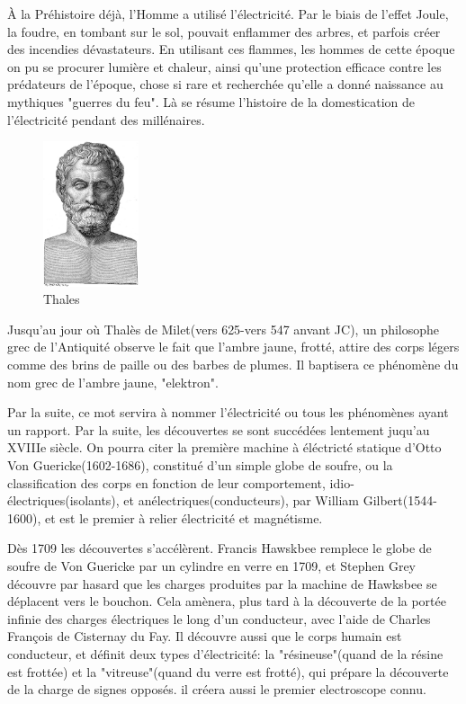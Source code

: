 \documentclass[11pt]{report}
\begin{document}
	    À la Préhistoire déjà, l'Homme a utilisé l'électricité. Par le biais de l'effet Joule, la foudre, en tombant sur le sol, pouvait enflammer des arbres, et parfois créer des incendies dévastateurs. En utilisant ces flammes, les hommes de cette époque on pu se procurer lumière et chaleur, ainsi qu'une protection efficace contre les prédateurs de l'époque, chose si rare et recherchée qu'elle a donné naissance au mythiques "guerres du feu". Là se résume l'histoire de la domestication de l'électricité pendant des millénaires.
\begin{figure}
  \begin{center}
    \includegraphics[width=0.25\textwidth]{thales}
  \end{center}
  \caption{Thales}
\end{figure} Jusqu'au jour où Thalès de Milet(vers 625-vers 547 anvant JC), un philosophe grec de l'Antiquité observe le fait que l'ambre jaune, frotté, attire des corps légers comme des brins de paille ou des barbes de plumes. Il baptisera ce phénomène du nom grec de l'ambre jaune, "elektron".

	Par la suite, ce mot servira à nommer l'électricité ou tous les phénomènes ayant un rapport. Par la suite, les découvertes se sont succédées lentement juqu'au XVIIIe siècle. On pourra citer la première machine à éléctricté statique d'Otto Von Guericke(1602-1686), constitué d'un simple globe de soufre, ou la classification des corps en fonction de leur comportement, idio-électriques(isolants), et anélectriques(conducteurs), par William Gilbert(1544-1600), et est le premier à relier électricité et magnétisme.

    Dès 1709 les découvertes s'accélèrent. Francis Hawskbee remplece le globe de soufre de Von Guericke par un cylindre en verre en 1709, et Stephen Grey découvre par hasard que les charges produites par la machine de Hawksbee se déplacent vers le bouchon. Cela amènera, plus tard à la découverte de la portée infinie des charges électriques le long d'un conducteur, avec l'aide de Charles François de Cisternay du Fay. Il découvre aussi que le corps humain est conducteur, et définit deux types d'électricité: la "résineuse"(quand de la résine est frottée) et la "vitreuse"(quand du verre est frotté), qui prépare la découverte de la charge de signes opposés. il créera aussi le premier electroscope connu.
\end{document}
